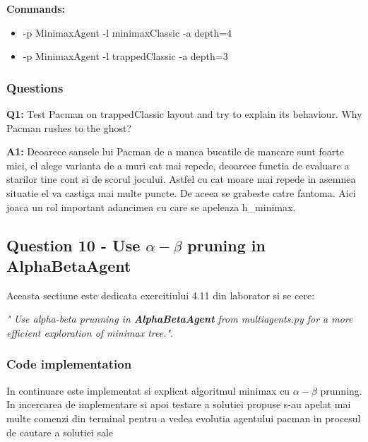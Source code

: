 \textbf{Commands:}
\begin{itemize}
    \setlength\itemsep{0em}
    \item -p MinimaxAgent -l minimaxClassic -a depth=4
    \item -p MinimaxAgent -l trappedClassic -a depth=3
        
\end{itemize}

\subsubsection{Questions}

\textbf{Q1:} Test Pacman on trappedClassic layout and try to explain its behaviour. Why Pacman rushes to the ghost?

\textbf{A1:} Deoarece sansele lui Pacman de a manca bucatile de mancare sunt foarte mici, el alege varianta de a muri cat mai repede, deoarece functia de evaluare a starilor tine cont si de scorul jocului. Astfel cu cat moare mai repede in asemnea situatie el va castiga mai multe puncte. De aceea se grabeste catre fantoma. Aici joaca un rol important adancimea cu care se apeleaza h\_minimax.


\vspace{0.75cm}

\subsection{Question 10 -  Use $\alpha - \beta$ pruning in AlphaBetaAgent}
Aceasta sectiune este dedicata exercitiului 4.11 din laborator si se cere: \newline


\textit{" Use alpha-beta prunning in \textbf{AlphaBetaAgent} from multiagents.py for a more efficient exploration of minimax tree."}.


\subsubsection{Code implementation}
In continuare este implementat si explicat algoritmul minimax cu $\alpha-\beta$ prunning. In incercarea de implementare si apoi testare a solutiei propuse s-au apelat mai multe comenzi din terminal pentru a vedea evolutia agentului pacman in procesul de cautare a solutiei sale \newline \\

